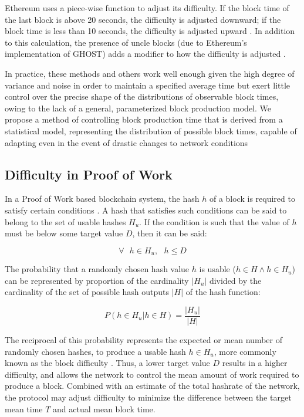 \documentclass[]{article}
\begin{document}
Ethereum uses a piece-wise function to adjust its difficulty.  If the block time of the last block is above 20 seconds, the difficulty is adjusted downward; if the block time is less than 10 seconds, the difficulty is adjusted upward \cite{EthereumDifficulty}.  In addition to this calculation, the presence of uncle blocks (due to Ethereum's implementation of GHOST) adds a modifier to how the difficulty is adjusted \cite{EthereumUncles}.
\newline

In practice, these methods and others work well enough given the high degree of variance and noise in order to maintain a specified average time but exert little control over the precise shape of the distributions of observable block times, owing to the lack of a general, parameterized block production model.  We propose a method of controlling block production time that is derived from a statistical model, representing the distribution of possible block times, capable of adapting even in the event of drastic changes to network conditions

\subsection{Difficulty in Proof of Work}
In a Proof of Work based blockchain system, the hash $h$ of a block is required to satisfy certain conditions \cite{BitcoinWhitepaper}.  A hash that satisfies such conditions can be said to belong to the set of usable hashes $H_u$.  If the condition is such that the value of $h$ must be below some target value $D$, then it can be said:

\begin{equation}
\forall \text{ } h \in H_u, \text{ } h \le D
\end{equation}

The probability that a randomly chosen hash value $h$ is usable ($h \in H \land h \in H_u$) can be represented by proportion of the cardinality $|H_u|$ divided by the cardinality of the set of possible hash outputs $|H|$ of the hash function: 

\begin{equation}
	P(h \in H_u | h \in H) = \frac{|H_u|}{|H|} 
\end{equation}

The reciprocal of this probability represents the expected or mean number of randomly chosen hashes, to produce a usable hash $h \in H_u$, more commonly known as the block difficulty \cite{BitcoinCore}.  Thus, a lower target value $D$ results in a higher difficulty, and allows the network to control the mean amount of work required to produce a block.  Combined with an estimate of the total hashrate of the network, the protocol may adjust difficulty to minimize the difference between the target mean time $T$ and actual mean block time.  
\end{document}
